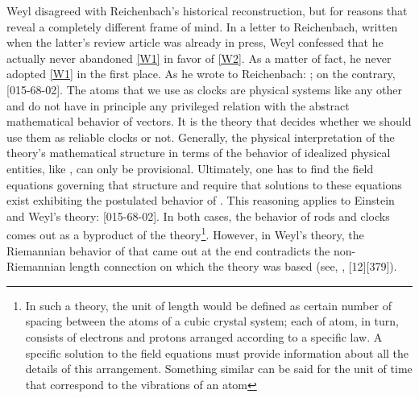 \documentclass[final]{article}
\newcommand{\WT}{Weyl's theory\xspace}
\begin{document}
Weyl disagreed with Reichenbach's historical reconstruction, but for reasons that reveal a completely different frame of mind. In a letter to Reichenbach, written when the latter's review article was already in press, Weyl confessed that he actually never abandoned \ref{W1} in favor of \ref{W2}. As a matter of fact, he never adopted \ref{W1} in the first place. As he wrote to Reichenbach: ; on the contrary,  [015-68-02]. The atoms that we use as clocks are physical systems like any other and do not have in principle any privileged relation with the abstract mathematical behavior of vectors. It is the theory that decides whether we should use them as reliable clocks or not. Generally, the physical interpretation of the theory's mathematical structure in terms of the behavior of idealized physical entities, like \rac, can only be provisional. Ultimately, one has to find the field equations governing that structure and require that solutions to these equations exist exhibiting the postulated behavior of \rac. This reasoning applies to Einstein and \WT:  [015-68-02]. In both cases, the behavior of rods and clocks comes out as a byproduct of the theory\footnote{In such a theory, the unit of length would be defined as certain number of spacing between the atoms of a cubic crystal system; each of atom, in turn, consists of electrons and protons arranged according to a specific law. A specific solution to the field equations must provide information about all the details of this arrangement. Something similar can be said for the unit of time that correspond to the vibrations of an atom}. However, in \WT, the Riemannian behavior of \rac that came out at the end contradicts the non-Riemannian length connection on which the theory was based (see, \eg, [12][379]).
\end{document}
